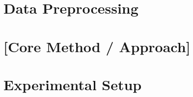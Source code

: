 \section{Data Preprocessing}



\section{[Core Method / Approach]}



\section{Experimental Setup}



